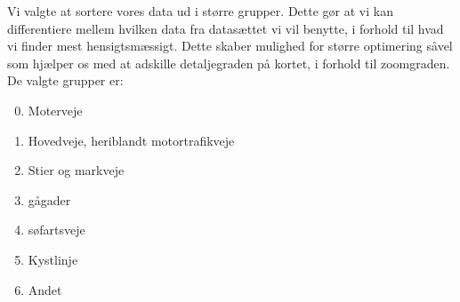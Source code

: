 Vi valgte at sortere vores data ud i større grupper. Dette gør at vi kan differentiere mellem hvilken data fra datasættet vi vil benytte, i forhold til hvad vi finder mest hensigtsmæssigt. Dette skaber mulighed for større optimering såvel som hjælper os med at adskille detaljegraden på kortet, i forhold til zoomgraden. De valgte grupper er:
\begin{enumerate}
\setcounter{enumi}{-1}
\item{Moterveje}
\item{Hovedveje, heriblandt motortrafikveje}
\item{Stier og markveje}
\item{gågader} 
\item{søfartsveje}
\item{Kystlinje}
\item{Andet}
\end{enumerate}